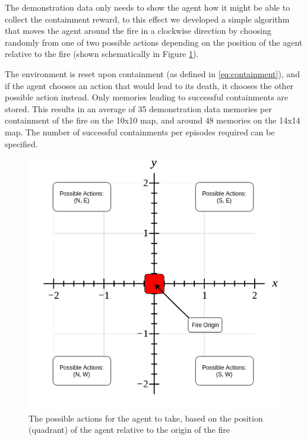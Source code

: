 The demonstration data only needs to show the agent how it might be able to collect the containment reward, to this effect we developed a simple algorithm that moves the agent around the fire in a clockwise direction by choosing randomly from one of two possible actions depending on the position of the agent relative to the fire (shown schematically in Figure \ref{fig:demodata}). 

The environment is reset upon containment (as defined in \eqref{eq:containment}), and if the agent chooses an action that would lead to its death, it chooses the other possible action instead. Only memories leading to successful containments are stored. This results in an average of 35 demonstration data memories per containment of the fire on the 10x10 map, and around 48 memories on the 14x14 map. The number of successful containments per episodes required can be specified.

\begin{figure}[h]
    \centering
    \includegraphics[width=1\linewidth]{img/Demo-data_Baseline.png}
    \caption{The possible actions for the agent to take, based on the position (quadrant) of the agent relative to the origin of the fire}
    \label{fig:demodata}
\end{figure}



